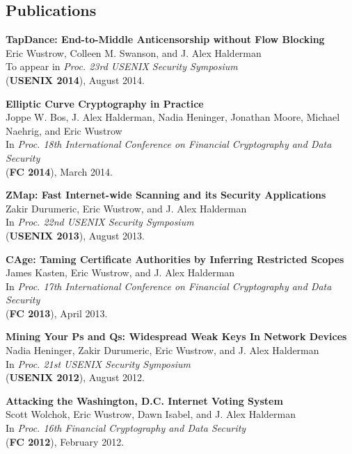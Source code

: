 \documentclass{res}
\begin{document}
\begin{resume}
\section{Publications}

    \textbf{TapDance: End-to-Middle Anticensorship without Flow Blocking} \\
    Eric Wustrow, Colleen M. Swanson, and J. Alex Halderman \\
    To appear in \emph{Proc. 23rd USENIX Security Symposium} \\
    (\textbf{USENIX 2014}), August 2014.

    \textbf{Elliptic Curve Cryptography in Practice} \\
    Joppe W. Bos, J. Alex Halderman, Nadia Heninger, Jonathan Moore, Michael Naehrig, and Eric Wustrow \\
    In \emph{Proc. 18th International Conference on Financial Cryptography and Data Security} \\
    (\textbf{FC 2014}), March 2014.

    \textbf{ZMap: Fast Internet-wide Scanning and its Security Applications} \\
    Zakir Durumeric, Eric Wustrow, and J. Alex Halderman \\
    In \emph{Proc. 22nd USENIX Security Symposium} \\
    (\textbf{USENIX 2013}), August 2013.

    \textbf{CAge: Taming Certificate Authorities by Inferring Restricted Scopes} \\
    James Kasten, Eric Wustrow, and J. Alex Halderman \\
    In \emph{Proc. 17th International Conference on Financial Cryptography and Data Security} \\
    (\textbf{FC 2013}), April 2013.

    \textbf{Mining Your Ps and Qs: Widespread Weak Keys In Network Devices} \\
    Nadia Heninger, Zakir Durumeric, Eric Wustrow, and J. Alex Halderman \\
    In \emph{Proc. 21st USENIX Security Symposium} \\
    (\textbf{USENIX 2012}), August 2012.

    \textbf{Attacking the Washington, D.C. Internet Voting System} \\
    Scott Wolchok, Eric Wustrow, Dawn Isabel, and J. Alex Halderman \\
    In \emph{Proc. 16th Financial Cryptography and Data Security} \\
    (\textbf{FC 2012}), February 2012.


\end{resume}
\end{document}
